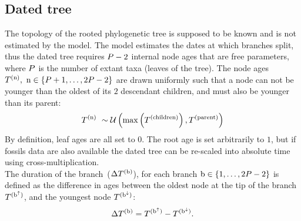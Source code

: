 \subsection{Dated tree}
The topology of the rooted phylogenetic tree is supposed to be known and is not estimated by the model. The model estimates the dates at which branches split, thus the dated tree requires $P - 2$ internal node ages that are free parameters, where $P$ is the number of extant taxa (leaves of the tree).
The node ages $T^{(\text{n})},\ \text{n} \in \{P + 1, \hdots, 2 P - 2\}$ are drawn uniformly such that a node can not be younger than the oldest of its $2$ descendant children, and must also be younger than its parent:
\begin{equation}
    \label{eq:Distribage}
    \age\nodeexp \ \sim \mathcal{U}\left( \mathrm{max}\left(\age^{(\mathrm{children})} \right), \age^{(\mathrm{parent})} \right)
\end{equation}
By definition, leaf ages are all set to $0$. The root age is set arbitrarily to $1$, but if fossils data are also available the dated tree can be re-scaled into absolute time using cross-multiplication.\\
The duration of the branch~($\Delta T^{(\text{b})}$), for each branch $\text{b} \in \{1, \hdots, 2 P - 2\}$ is defined as the difference in ages between the oldest node at the tip of the branch $T^{(\text{b}^{\uparrow})}$, and the youngest node $T^{(\text{b}^{\downarrow})}$:
\begin{equation}
    \label{eq:ageTobranchtime}
    \branchtime\branchexp = \age^{(\nodeUp)} - \age^{(\nodeDown)}.
\end{equation}


